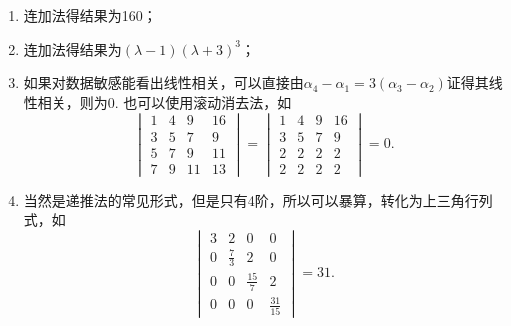 \documentclass[UTF8,12pt,a4paper,fontset=fandol]{ctexart}
\begin{document}
\begin{solve}
\begin{enumerate}
                \item 连加法得结果为160；

                \item 连加法得结果为$(\lambda-1)(\lambda+3)^3$；

                \item 如果对数据敏感能看出线性相关，可以直接由$\alpha_4-\alpha_1=3(\alpha_3-\alpha_2)$证得其线性相关，则为0. 也可以使用滚动消去法，如\[
                          \begin{vmatrix}
                              1 & 4 & 9  & 16 \\
                              3 & 5 & 7  & 9  \\
                              5 & 7 & 9  & 11 \\
                              7 & 9 & 11 & 13
                          \end{vmatrix}=\begin{vmatrix}
                              1 & 4 & 9 & 16 \\
                              3 & 5 & 7 & 9  \\
                              2 & 2 & 2 & 2  \\
                              2 & 2 & 2 & 2
                          \end{vmatrix}=0.\]

                \item 当然是递推法的常见形式，但是只有4阶，所以可以暴算，转化为上三角行列式，如\[
                          \begin{vmatrix}
                              3 & 2           & 0            & 0             \\
                              0 & \frac{7}{3} & 2            & 0             \\
                              0 & 0           & \frac{15}{7} & 2             \\
                              0 & 0           & 0            & \frac{31}{15}
                          \end{vmatrix}=31.\]
            \end{enumerate}
\end{solve}
\end{document}
